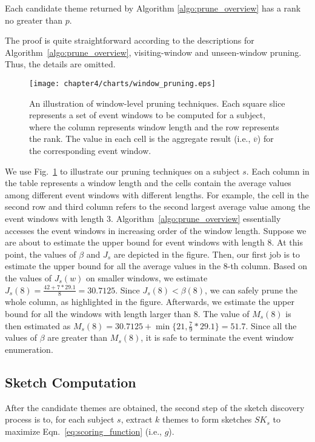 \begin{theorem}
\label{thm:window_prune}
Each candidate theme returned by Algorithm \ref{algo:prune_overview} has a rank no greater than $p$. 
\end{theorem}
The proof is quite straightforward according to the descriptions for Algorithm~\ref{algo:prune_overview}, visiting-window and unseen-window pruning. Thus, the details are omitted.

\begin{figure}[t]
\centering
\texttt{[image: chapter4/charts/window\_pruning.eps]}
	\caption{An illustration of window-level pruning techniques. Each square slice represents a
	set of event windows to be computed for a subject, where the column represents window length and the row represents
	the rank. The value in each cell is the aggregate result (i.e., $\overline{v}$) for the corresponding event window.}
\label{fig:window_pruning}
\end{figure}

\begin{example}
We use Fig.~\ref{fig:window_pruning} to illustrate our pruning techniques on a subject $s$.  Each column in the table represents a window length and the cells contain the average values among different event windows with different lengths. For example, the cell in the second row and third column refers to the second largest average value among the event windows with length $3$. Algorithm~\ref{algo:prune_overview} essentially accesses the event windows in increasing order of the window length. Suppose we are about to estimate the upper bound for event windows with length $8$. At this point, the values of $\beta$ and $J_s$ are depicted in the figure. Then, our first job is to estimate the upper bound for all the average values in the $8$-th column.  Based on the values of $J_s(w)$ on smaller windows, we estimate $J_s(8) = \frac{42+7*29.1}{8}= 30.7125$. Since $J_s(8) < \beta(8)$, we can safely prune the whole column, as highlighted in the figure. Afterwards, we estimate the upper bound for all the windows with length larger than $8$. The value of $M_s(8)$ is then estimated as $M_s(8)= 30.7125 + \min\{21, \frac{7}{9}*29.1\}=51.7$. Since all the values of $\beta$ are greater than $M_s(8)$, it is safe to terminate the event window enumeration.
\end{example}

\subsection{Sketch Computation}
After the candidate themes are obtained,
the second step of the sketch discovery process is to, for each subject $s$, extract 
$k$ themes to form sketches $SK_s$ to maximize Eqn.~\ref{eq:scoring_function} (i.e., $g$). 

